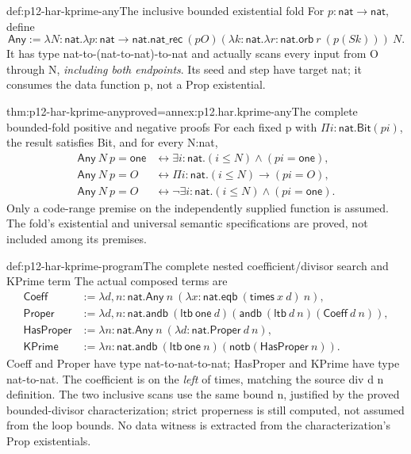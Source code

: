 \begin{hbdefinition}{def:p12-har-kprime-any}{The inclusive bounded existential fold}
For \(p:\mathsf{nat}\to\mathsf{nat}\), define
\[
 \mathsf{Any}:=\lambda N:\mathsf{nat}.\lambda p:\mathsf{nat}\to\mathsf{nat}.
    \mathsf{nat\_rec}\ (p O)
       (\lambda k:\mathsf{nat}.\lambda r:\mathsf{nat}.
           \mathsf{orb}\ r\ (p(S k)))\ N.
\]
It has type nat-to-(nat-to-nat)-to-nat and actually scans every input
from O through N, \emph{including both endpoints}. Its seed and step
have target nat; it consumes the data function p, not a Prop existential.
\end{hbdefinition}

\begin{hbtheorem}{thm:p12-har-kprime-any}{proved=annex:p12.har.kprime-any}{The complete bounded-fold positive and negative proofs}
For each fixed p with \(\Pi i:\mathsf{nat}.\mathsf{Bit}(p i)\),
the result satisfies Bit, and for every N:nat,
\[
\begin{aligned}
 \mathsf{Any}\ N\ p=\mathsf{one}&\leftrightarrow
             \exists i:\mathsf{nat}.(i\le N)\wedge(p i=\mathsf{one}),\\
 \mathsf{Any}\ N\ p=O&\leftrightarrow
             \Pi i:\mathsf{nat}.(i\le N)\to(p i=O),\\
 \mathsf{Any}\ N\ p=O&\leftrightarrow
             \neg\exists i:\mathsf{nat}.(i\le N)\wedge(p i=\mathsf{one}).
\end{aligned}
\]
Only a code-range premise on the independently supplied function is
assumed. The fold's existential and universal semantic specifications
are proved, not included among its premises.
\end{hbtheorem}

\begin{hbdefinition}{def:p12-har-kprime-program}{The complete nested coefficient/divisor search and KPrime term}
The actual composed terms are
\[
\begin{aligned}
 \mathsf{Coeff}&:=\lambda d,n:\mathsf{nat}.
   \mathsf{Any}\ n\ (\lambda x:\mathsf{nat}.
                \mathsf{eqb}\ (\mathsf{times}\ x\ d)\ n),\\
 \mathsf{Proper}&:=\lambda d,n:\mathsf{nat}.
   \mathsf{andb}\ (\mathsf{ltb}\ \mathsf{one}\ d)
    (\mathsf{andb}\ (\mathsf{ltb}\ d\ n)(\mathsf{Coeff}\ d\ n)),\\
 \mathsf{HasProper}&:=\lambda n:\mathsf{nat}.
        \mathsf{Any}\ n\ (\lambda d:\mathsf{nat}.\mathsf{Proper}\ d\ n),\\
 \mathsf{KPrime}&:=\lambda n:\mathsf{nat}.
   \mathsf{andb}\ (\mathsf{ltb}\ \mathsf{one}\ n)
             (\mathsf{notb}(\mathsf{HasProper}\ n)).
\end{aligned}
\]
Coeff and Proper have type nat-to-nat-to-nat; HasProper and KPrime
have type nat-to-nat. The coefficient is on the \emph{left} of times,
matching the source div d n definition. The two inclusive scans use the
same bound n, justified by the proved bounded-divisor characterization;
strict properness is still computed, not assumed from the loop bounds.
No data witness is extracted from the characterization's Prop existentials.
\end{hbdefinition}

